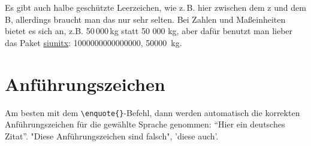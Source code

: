 Es gibt auch halbe geschützte Leerzeichen, wie z.\,B. hier zwischen dem z und dem B, allerdings braucht man das nur sehr selten. Bei Zahlen und Maßeinheiten bietet es sich an, z.B. 50\,000\,kg statt 50 000 kg, aber dafür benutzt man lieber das Paket \href{http://mirrors.ctan.org/macros/latex/contrib/siunitx/siunitx.pdf}{siunitx}: \num{1000000000000000}, \SI{50000}{\kg}.

\section{Anführungszeichen}
Am besten mit dem \verb+\enquote{}+-Befehl, dann werden automatisch die korrekten Anführungszeichen für die gewählte Sprache genommen: \enquote{Hier ein deutsches Zitat}.
"Diese Anführungszeichen sind falsch", 'diese auch'.
